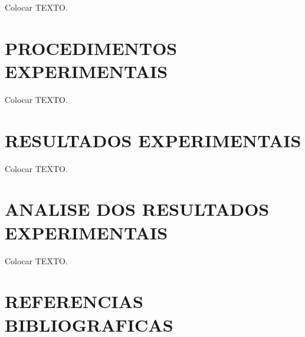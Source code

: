 \documentclass[10pt,twocolumn,letterpaper]{article}
\begin{document}
\hspace{1cm} Colocar TEXTO.

\vspace{.75cm}

\vspace{.75cm}

\section{PROCEDIMENTOS EXPERIMENTAIS}

\hspace{1cm} Colocar TEXTO.

\vspace{.75cm}

\section{RESULTADOS EXPERIMENTAIS}

\hspace{1cm} Colocar TEXTO.

\vspace{.75cm}

\section{ANALISE DOS RESULTADOS EXPERIMENTAIS}

\hspace{1cm} Colocar TEXTO.

\vspace{.75cm}

\section{REFERENCIAS BIBLIOGRAFICAS}
\end{document}
